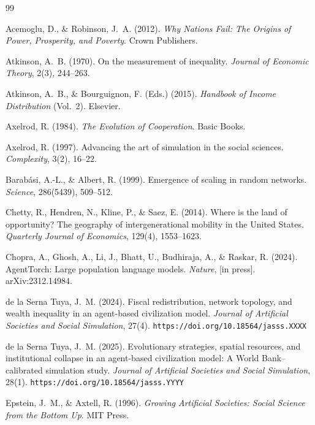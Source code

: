 \documentclass[12pt, letterpaper]{article}
\begin{document}
\begin{thebibliography}{99}

Acemoglu, D., \& Robinson, J.~A. (2012).
\textit{Why Nations Fail: The Origins of Power, Prosperity, and Poverty}.
Crown Publishers.

Atkinson, A.~B. (1970).
On the measurement of inequality.
\textit{Journal of Economic Theory}, 2(3), 244--263.

Atkinson, A.~B., \& Bourguignon, F. (Eds.) (2015).
\textit{Handbook of Income Distribution} (Vol.~2).
Elsevier.

Axelrod, R. (1984).
\textit{The Evolution of Cooperation}.
Basic Books.

Axelrod, R. (1997).
Advancing the art of simulation in the social sciences.
\textit{Complexity}, 3(2), 16--22.

Barabási, A.-L., \& Albert, R. (1999).
Emergence of scaling in random networks.
\textit{Science}, 286(5439), 509--512.

Chetty, R., Hendren, N., Kline, P., \& Saez, E. (2014).
Where is the land of opportunity? The geography of intergenerational
mobility in the United States.
\textit{Quarterly Journal of Economics}, 129(4), 1553--1623.

Chopra, A., Ghosh, A., Li, J., Bhatt, U., Budhiraja, A.,
\& Raskar, R. (2024).
AgentTorch: Large population language models.
\textit{Nature}, [in press]. arXiv:2312.14984.

de la Serna Tuya, J.~M. (2024).
Fiscal redistribution, network topology, and wealth inequality in an
agent-based civilization model.
\textit{Journal of Artificial Societies and Social Simulation}, 27(4).
\texttt{https://doi.org/10.18564/jasss.XXXX}

de la Serna Tuya, J.~M. (2025).
Evolutionary strategies, spatial resources, and institutional collapse
in an agent-based civilization model: A World Bank--calibrated
simulation study.
\textit{Journal of Artificial Societies and Social Simulation}, 28(1).
\texttt{https://doi.org/10.18564/jasss.YYYY}

Epstein, J.~M., \& Axtell, R. (1996).
\textit{Growing Artificial Societies: Social Science from the Bottom Up}.
MIT Press.


\end{thebibliography}
\end{document}
